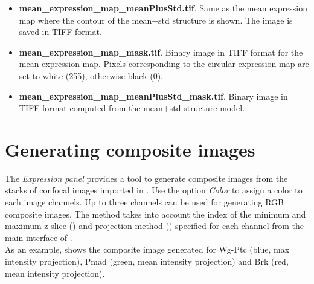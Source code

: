 \begin{itemize}
 \item \textbf{mean\_expression\_map\_meanPlusStd.tif}. Same as the mean expression map where the contour of the mean+std structure is shown. The image is saved in TIFF format.
 \item \textbf{mean\_expression\_map\_mask.tif}. Binary image in TIFF format for the mean expression map. Pixels corresponding to the circular expression map are set to white (255), otherwise black (0).
 \item \textbf{mean\_expression\_map\_meanPlusStd\_mask.tif}. Binary image in TIFF format computed from the mean+std structure model.
\end{itemize}

\section{Generating composite images}\label{sec:expression_composite}
The \textit{Expression panel} provides a tool to generate composite images from the stacks of confocal images imported in \wingj. Use the option \textit{Color} to assign a color to each image channels. Up to three channels can be used for generating RGB composite images. The method takes into account the index of the minimum and maximum z-slice () and projection method () specified for each channel from the main interface of \wingj.\\

As an example,  shows the composite image generated for Wg-Ptc (blue, max intensity projection), Pmad (green, mean intensity projection) and Brk (red, mean intensity projection).

